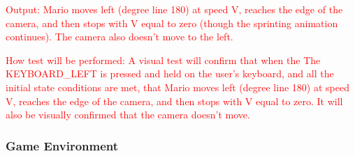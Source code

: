 \documentclass[12pt, titlepage]{article}
\begin{document}
\begin{enumerate}
\textcolor{red}{Output: Mario moves left (degree line 180) at speed V, reaches the edge of the camera, and then stops with V equal to zero (though the sprinting animation continues). The camera also doesn't move to the left.}

\textcolor{red}{How test will be performed: A visual test will confirm that when the The KEYBOARD\_LEFT is pressed and held on the user's keyboard, and all the initial state conditions are met, that Mario moves left (degree line 180) at speed V, reaches the edge of the camera, and then stops with V equal to zero. It will also be visually confirmed that the camera doesn't move.}

\end{enumerate}

\subsubsection{Game Environment}
\end{document}
